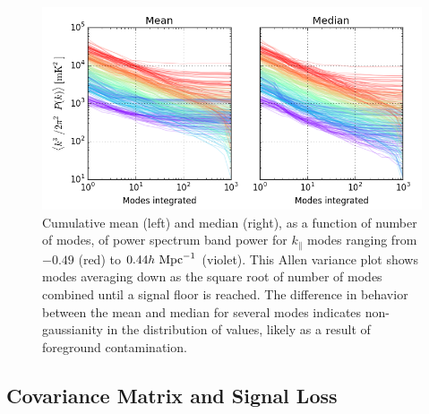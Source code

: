 \documentclass[twocolumn,numberedappendix]{emulateapj} \shorttitle{PSA64}
\begin{document}
\begin{figure}[t!]\centering
\includegraphics[width=1.8\columnwidth]{plots/pspec_variance.png}
\caption{
Cumulative mean (left) and median (right), as a function of number of modes,
of power spectrum band power for
$k_\parallel$ modes ranging from $-0.49$ (red) to $0.44h\ {\rm Mpc}^{-1}$ (violet).
This Allen variance plot shows modes averaging down as the square root of
number of modes combined until a signal floor is reached.  The difference in
behavior between the mean and median for several modes indicates non-gaussianity
in the distribution of values, likely as a result of foreground contamination.
}\label{fig:pspec_variance}
\end{figure}


\subsection{Covariance Matrix and Signal Loss}
\label{sec:sigloss}
%
\end{document}
